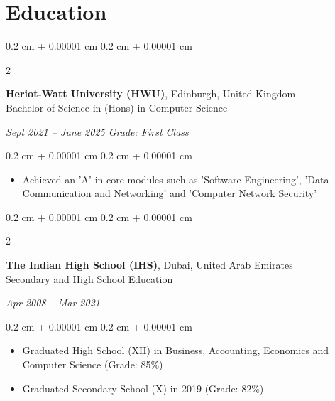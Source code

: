 \documentclass[10pt, letterpaper]{article}
\newenvironment{highlights}{
    \begin{itemize}[
        topsep=0.10 cm,
        parsep=0.10 cm,
        partopsep=0pt,
        itemsep=0pt,
        leftmargin=0.4 cm + 10pt
    ]
}{
    \end{itemize}
} %
\newenvironment{onecolentry}{
    \begin{adjustwidth}{
        0.2 cm + 0.00001 cm
    }{
        0.2 cm + 0.00001 cm
    }
}{
    \end{adjustwidth}
} %
\newenvironment{twocolentry}[2][]{
    \onecolentry
    \def\secondColumn{#2}
    \setcolumnwidth{\fill, 4.5 cm}
    \begin{paracol}{2}
}{
    \switchcolumn \raggedleft \secondColumn
    \end{paracol}
    \endonecolentry
} %
\begin{document}

    \section{Education}
    \begin{twocolentry}{
        \textit{Sept 2021 – June 2025 \quad Grade: First Class}}
            \textbf{Heriot-Watt University (HWU)}, Edinburgh, United Kingdom 
            \\ Bachelor of Science in (Hons) in Computer Science
    \end{twocolentry}
    \vspace{0.10 cm}
    \begin{onecolentry}
        \begin{highlights}
            \item Achieved an 'A' in core modules such as 'Software Engineering', 'Data Communication and Networking' and 'Computer Network Security'
        \end{highlights}
    \end{onecolentry}

    \vspace{0.2 cm}

    \begin{twocolentry}{
        \textit{Apr 2008 – Mar 2021}}
        \textbf{The Indian High School (IHS)}, Dubai, United Arab Emirates
        \\ Secondary and High School Education 
    \end{twocolentry}
    \vspace{0.10 cm}
    \begin{onecolentry}
        \begin{highlights}
            \item Graduated High School (XII) in Business, Accounting, Economics and Computer Science (Grade: 85\%)
        \end{highlights}
                \begin{highlights}
            \item Graduated Secondary School (X) in 2019 (Grade: 82\%)
        \end{highlights}
    \end{onecolentry}
\end{document}
